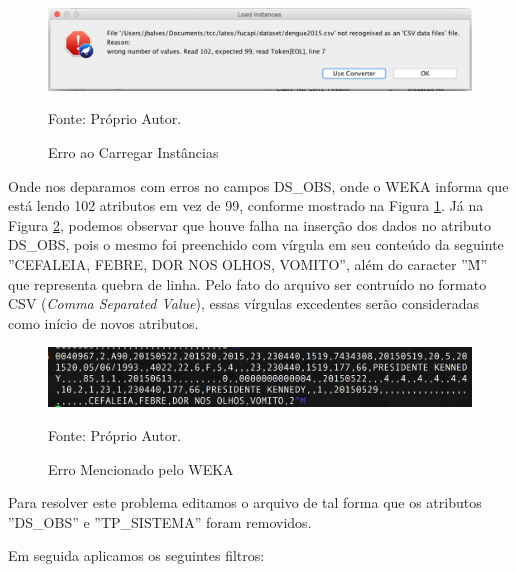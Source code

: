\documentclass[
	12pt,				%
	openright,			%
	oneside,	
	a4paper,				%
	english,				%
	brazil				%
]{abntex2/abntex2} %
\begin{document}
		\begin{figure}[!htb]
			\caption{\label{figerroCarregarInstancias} Erro ao Carregar Instâncias}
			\begin{center}
				\includegraphics[scale=0.55]{img/erroCarregarInstancias.png}
			\end{center}
			Fonte: Próprio Autor.
		\end{figure}

	Onde nos deparamos com erros no campos DS\_OBS, onde o WEKA informa que está lendo 102 atributos em vez de 99, conforme mostrado na Figura \ref{figerroCarregarInstancias}. Já na Figura \ref{figerroLinhaSete}, podemos observar que houve falha na inserção dos dados no atributo DS\_OBS, pois o mesmo foi preenchido com vírgula em seu conteúdo da seguinte ''CEFALEIA, FEBRE, DOR NOS OLHOS, VOMITO'', além do caracter ''\^M'' que representa quebra de linha. Pelo fato do arquivo ser contruído no formato CSV (\textit{Comma Separated Value}), essas vírgulas excedentes serão consideradas como início de novos atributos.
	

	
		\begin{figure}[!htb]
			\caption{\label{figerroLinhaSete} Erro Mencionado pelo WEKA}
			\begin{center}
				\includegraphics[scale=0.45]{img/erroLinhaSete.png}
			\end{center}
			Fonte: Próprio Autor.
		\end{figure}
		
		Para resolver este problema editamos o arquivo de tal forma que os atributos ''DS\_OBS'' e ''TP\_SISTEMA'' foram removidos. 
		
		Em seguida aplicamos os seguintes filtros:
		
\end{document}

